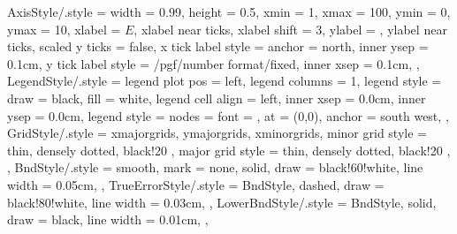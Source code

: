 \pgfplotsset
{
	AxisStyle/.style =
	{
		width					= 0.99\columnwidth,
		height					= 0.5\columnwidth,
		xmin					= 1,
		xmax					= 100,
		ymin					= 0,
		ymax					= 10,
		xlabel					= {$E$},
		xlabel near ticks,
		xlabel shift			= 3,
		ylabel					= {},
		ylabel near ticks,
		scaled y ticks			= false,
		x tick label style		= {anchor = north, inner ysep = 0.1cm},
		y tick label style		= {/pgf/number format/fixed, inner xsep = 0.1cm},
	},
	LegendStyle/.style =
	{
		legend plot pos			= left,
		legend columns			= 1,
		legend style			= {draw = black, fill = white},
		legend cell align		= left,
		inner xsep				= 0.0cm,
		inner ysep				= 0.0cm,
		legend style			=
		{
			nodes				= {font = \scriptsize},
			at					= {(0,0)},
			anchor				= south west,
		}
	},
	GridStyle/.style =
	{
		xmajorgrids,
		ymajorgrids,
		xminorgrids,
		minor grid style =
		{
			thin,
			densely dotted,
			black!20
		},
		major grid style =
		{
			thin,
			densely dotted,
			black!20
		},
	},
	BndStyle/.style =
	{
		smooth,
		mark			= none,
		solid,
		draw			= black!60!white,
		line width		= 0.05cm,
	},
	TrueErrorStyle/.style =
	{
		BndStyle,
		dashed,
		draw			= black!80!white,
		line width		= 0.03cm,
	},
	LowerBndStyle/.style =
	{
		BndStyle,
		solid,
		draw			= black,
		line width		= 0.01cm,
	},
}

